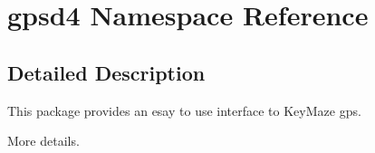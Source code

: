 \hypertarget{namespacegpsd4}{
\section{gpsd4 Namespace Reference}
\label{namespacegpsd4}
}




\subsection{Detailed Description}
This package provides an esay to use interface to KeyMaze gps.

More details. 